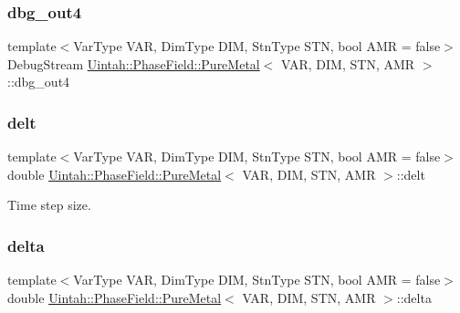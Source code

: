 \subsubsection{\texorpdfstring{dbg\+\_\+out4}{dbg\_out4}}
{\footnotesize\ttfamily template$<$Var\+Type V\+AR, Dim\+Type D\+IM, Stn\+Type S\+TN, bool A\+MR = false$>$ \\
Debug\+Stream \hyperlink{classUintah_1_1PhaseField_1_1PureMetal}{Uintah\+::\+Phase\+Field\+::\+Pure\+Metal}$<$ V\+AR, D\+IM, S\+TN, A\+MR $>$\+::dbg\+\_\+out4\hspace{0.3cm}{\ttfamily [protected]}}

\mbox{\label{classUintah_1_1PhaseField_1_1PureMetal_a244f4421efcb74abb18b6fc3db820f3c}} 
\subsubsection{\texorpdfstring{delt}{delt}}
{\footnotesize\ttfamily template$<$Var\+Type V\+AR, Dim\+Type D\+IM, Stn\+Type S\+TN, bool A\+MR = false$>$ \\
double \hyperlink{classUintah_1_1PhaseField_1_1PureMetal}{Uintah\+::\+Phase\+Field\+::\+Pure\+Metal}$<$ V\+AR, D\+IM, S\+TN, A\+MR $>$\+::delt\hspace{0.3cm}{\ttfamily [protected]}}



Time step size. 

\mbox{\label{classUintah_1_1PhaseField_1_1PureMetal_a36639bdedb3da620d4e0d3bc760ab0be}} 
\subsubsection{\texorpdfstring{delta}{delta}}
{\footnotesize\ttfamily template$<$Var\+Type V\+AR, Dim\+Type D\+IM, Stn\+Type S\+TN, bool A\+MR = false$>$ \\
double \hyperlink{classUintah_1_1PhaseField_1_1PureMetal}{Uintah\+::\+Phase\+Field\+::\+Pure\+Metal}$<$ V\+AR, D\+IM, S\+TN, A\+MR $>$\+::delta\hspace{0.3cm}{\ttfamily [protected]}}



